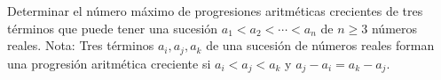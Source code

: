 Determinar el número máximo de progresiones aritméticas crecientes de tres términos que puede tener una sucesión $a_1 < a_2 < \cdots < a_n$ de $n \geq 3$ números reales. \newline 
Nota: Tres términos $a_i, a_j, a_k$ de una sucesión de números reales forman una progresión aritmética creciente si $a_i < a_j < a_k$ y $a_j - a_i = a_k - a_j$.
